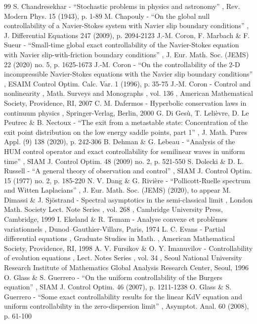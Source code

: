 \documentclass[11pt]{article}
\numberwithin{equation}{section}
\begin{document}
\begin{thebibliography}{99}
 S. Chandresekhar - “Stochastic problems in physics and astronomy” , Rev. Modern Phys. 15 (1943), p. 1-89
 M. Chapouly - “On the global null controllability of a Navier-Stokes system with Navier slip boundary conditions” , J. Differential Equations 247 (2009), p. 2094-2123
 J.-M. Coron, F. Marbach \& F. Sueur - “Small-time global exact controllability of the Navier-Stokes equation with Navier slip-with-friction boundary conditions” , J. Eur. Math. Soc. (JEMS) 22 (2020) no. 5, p. 1625-1673
 J.-M. Coron - “On the controllability of the $2$-D incompressible Navier-Stokes equations with the Navier slip boundary conditions” , ESAIM Control Optim. Calc. Var. 1 (1996), p. 35-75
 J.-M. Coron - Control and nonlinearity , Math. Surveys and Monographs , vol. 136 , American Mathematical Society, Providence, RI, 2007
 C. M. Dafermos - Hyperbolic conservation laws in continuum physics , Springer-Verlag, Berlin, 2000
 G. Di Gesù, T. Lelièvre, D. Le Peutrec \& B. Nectoux - “The exit from a metastable state: Concentration of the exit point distribution on the low energy saddle points, part 1” , J. Math. Pures Appl. (9) 138 (2020), p. 242-306
 B. Dehman \& G. Lebeau - “Analysis of the HUM control operator and exact controllability for semilinear waves in uniform time” , SIAM J. Control Optim. 48 (2009) no. 2, p. 521-550
 S. Dolecki \& D. L. Russell - “A general theory of observation and control” , SIAM J. Control Optim. 15 (1977) no. 2, p. 185-220
 N. V. Dang \& G. Rivière - “Pollicott-Ruelle spectrum and Witten Laplacians” , J. Eur. Math. Soc. (JEMS) (2020), to appear
 M. Dimassi \& J. Sjöstrand - Spectral asymptotics in the semi-classical limit , London Math. Society Lect. Note Series , vol. 268 , Cambridge University Press, Cambridge, 1999
 I. Ekeland \& R. Temam - Analyse convexe et problèmes variationnels , Dunod–Gauthier-Villars, Paris, 1974
 L. C. Evans - Partial differential equations , Graduate Studies in Math. , American Mathematical Society, Providence, RI, 1998
 A. V. Fursikov \& O. Y. Imanuvilov - Controllability of evolution equations , Lect. Notes Series , vol. 34 , Seoul National University Research Institute of Mathematics Global Analysis Research Center, Seoul, 1996
 O. Glass \& S. Guerrero - “On the uniform controllability of the Burgers equation” , SIAM J. Control Optim. 46 (2007), p. 1211-1238
 O. Glass \& S. Guerrero - “Some exact controllability results for the linear KdV equation and uniform controllability in the zero-dispersion limit” , Asymptot. Anal. 60 (2008), p. 61-100

\end{thebibliography}
\end{document}
